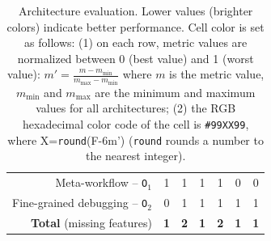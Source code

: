 \documentclass[preprint,3p,twocolumn]{elsarticle}
\newcommand{\correction}[1]{\color{blue}#1\color{black}\xspace}
\begin{document}
\begin{table}
\begin{tabular}{rcccccc}
  Meta-workflow  -- \texttt{O$_1$}    & \cellcolor[HTML]{999999}1
                                     & \cellcolor[HTML]{999999}1
                                     & \cellcolor[HTML]{99FF99}\correction{1}
                                     & \cellcolor[HTML]{999999}1
                                     & \cellcolor[HTML]{99FF99}0
                                     & \cellcolor[HTML]{99FF99}0\\
  Fine-grained debugging -- \texttt{O$_2$}   & \cellcolor[HTML]{99FF99}0
                                     & \cellcolor[HTML]{999999}1
                                     & \cellcolor[HTML]{999999}1
                                     & \cellcolor[HTML]{999999}1
                                     & \cellcolor[HTML]{999999}1
                                     & \cellcolor[HTML]{999999}1\\
  \textbf{Total} (missing features) & \cellcolor[HTML]{99FF99}\textbf{1}
                                     & \cellcolor[HTML]{999999}\textbf{2}
                                     & \cellcolor[HTML]{99FF99}\textbf{1}
                                     & \cellcolor[HTML]{999999}\textbf{2}
                                     & \cellcolor[HTML]{99FF99}\textbf{1}
                                     & \cellcolor[HTML]{99FF99}\textbf{1}\\
\end{tabular}

\caption{Architecture evaluation. Lower values (brighter colors) indicate better performance. Cell color is set as follows: (1) on each row, metric values are
  normalized between 0 (best value) and 1 (worst value):
  $m'=\frac{m-m_{\mathrm{min}}}{m_{\mathrm{max}}-m_{\mathrm{min}}}$ where
  $m$ is the metric value, $m_{\mathrm{min}}$ and $m_{\mathrm{max}}$
  are the minimum and maximum values for all architectures; (2) the RGB hexadecimal color code of the cell
  is \texttt{\#99XX99}, where X=\texttt{round}(F-6m') (\texttt{round} rounds a number to the nearest integer). }
\label{table:evaluation}
\end{table}
\end{document}
